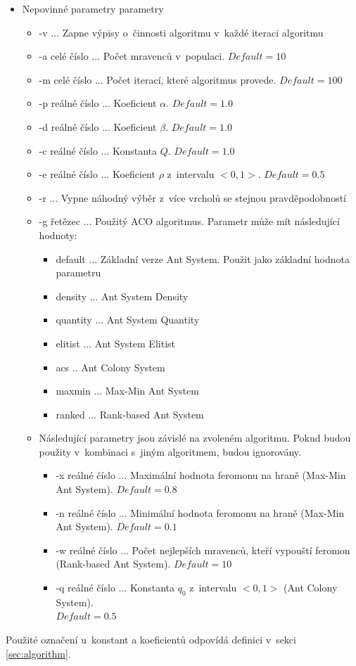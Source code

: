 \documentclass[a4paper, 12pt]{article}
\newcommand{\defVal}[1]{$Default=#1$}
\begin{document}
  \begin{itemize}
    \item Nepovinné parametry parametry
    \begin{itemize}
      \item -v ... Zapne výpisy o~činnosti algoritmu v~každé iteraci algoritmu
      \item -a celé číslo ... Počet mravenců v~populaci. \defVal{10}
      \item -m celé číslo ... Počet iterací, které algoritmus provede. \defVal{100}
      \item -p reálné číslo ...  Koeficient $\alpha$. \defVal{1.0}
      \item -d reálné číslo ... Koeficient $\beta$. \defVal{1.0}
      \item -c reálné číslo ... Konstanta $Q$. \defVal{1.0}
      \item -e reálné číslo ... Koeficient $\rho$ z~intervalu $<0,1>$. \defVal{0.5}
      \item -r ... Vypne náhodný výběr z~více vrcholů se stejnou pravděpodobností
      \item -g řetězec ... Použitý ACO algoritmus. Parametr může mít následující hodnoty:
      \begin{itemize}
       \item default ... Základní verze Ant System. Použit jako základní hodnota parametru
       \item density ... Ant System Density
       \item quantity ... Ant System Quantity
       \item elitist ... Ant System Elitist
       \item acs .. Ant Colony System
       \item maxmin ... Max-Min Ant System
       \item ranked ... Rank-based Ant System
      \end{itemize}
      \item Následující parametry jsou závislé na zvoleném algoritmu. Pokud budou použity v~kombinaci s~jiným algoritmem, budou ignorovány.
      \begin{itemize}
        \item -x reálné číslo ... Maximální hodnota feromonu na hraně (Max-Min Ant System). \defVal{0.8}
        \item -n reálné číslo ... Minimální hodnota feromonu na hraně (Max-Min Ant System). \defVal{0.1}
        \item -w reálné číslo ... Počet nejlepších mravenců, kteří vypouští feromon (Rank-based Ant System). \defVal{10}
        \item -q reálné číslo ... Konstanta $q_0$ z~intervalu $<0,1>$ (Ant Colony System).\\\defVal{0.5}
      \end{itemize}
    \end{itemize}
  \end{itemize}
Použité označení u~konstant a koeficientů odpovídá definici v~sekci \ref{sec:algorithm}.
\end{document}
